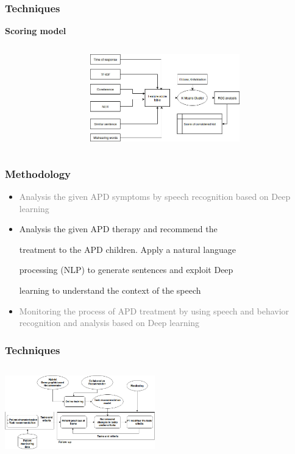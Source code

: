\documentclass{beamer}
\begin{document}
\begin{frame}
\frametitle{Techniques}
\textbf{Scoring model} 
\begin{columns}[T]
	\begin{column}{.3\textwidth}
	
	\end{column}
	\begin{column}{.7\textwidth}
		
		\includegraphics[width=65mm]{f6.jpg}
		
	\end{column}
\end{columns}

\end{frame}
\begin{frame}
	\frametitle{Methodology}
	\begin{itemize}
		\item \textcolor{gray}{Analysis  the  given  APD  symptoms  by  speech  
		recognition  based  on  Deep  learning}
		\item Analysis  the  given  APD  therapy  and  recommend  the
			
			treatment  to  the  APD  children.  Apply  a  natural  language
			
			processing  (NLP)  to  generate  sentences  and  exploit  Deep
			
			learning  to  understand  the  context  of  the  speech
		
		\item \textcolor{gray} {Monitoring  the  process  of  APD  treatment  by  using  speech 	and  behavior  recognition  and  analysis  based  on  Deep learning}
	
	\end{itemize}

\end{frame}
\begin{frame}
	\frametitle{Techniques}
	
		\begin{column}{.3\textwidth}
	
	\end{column}
	\begin{column}{.7\textwidth}
		
			\includegraphics[width=65mm]{f3(1).jpg}
		
	\end{column}
\end{frame}
\end{document}
